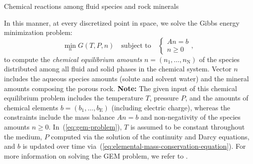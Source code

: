 \begin{frame}{Chemical reactions among fluid species and rock minerals}
	
	In this manner, at every discretized point in space, we solve the
	Gibbs energy minimization problem:
	\begin{equation}
		\min_{n}G(T,P,n)\quad\text{subject to}\quad\left\{ \begin{aligned}An=b\\
			n\geq0
		\end{aligned}
		\right.,\label{eq:gem-problem}
	\end{equation}
	to compute the \emph{chemical equilibrium amounts }$n=(n_{1},\ldots,n_{\mathrm{N}})$
	of the species distributed among all fluid and solid phases in the
	chemical system. Vector $n$ includes the aqueous species amounts
	(solute and solvent water) and the mineral amounts composing the porous
	rock. \textbf{Note: }The given input of this chemical equilibrium
	problem includes the temperature $T$, pressure $P$, and the amounts
	of chemical elements $b=(b_{1},\ldots,b_{\mathrm{E}})$ (including
	electric charge), whereas the constraints include the mass balance
	$An=b$ and non-negativity of the species amounts $n\geq0$. In~(\ref{eq:gem-problem}),
	$T$ is assumed to be constant throughout the medium, $P$ computed
	via the solution of the continuity and Darcy equations, and \textbf{$b$}
	is updated over time via~(\ref{eq:elemental-mass-conservation-equation}).
	For more information on solving the GEM problem, we refer to \citet{Leal2017,Allanetal2020}.
\end{frame}

